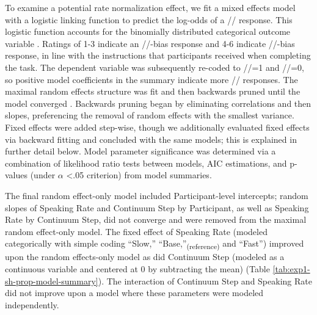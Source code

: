 \documentclass[preprint]{JASA}
\begin{document}

To examine a potential rate normalization effect, we fit a mixed effects model with a logistic linking function to predict the log-odds of a /\textesh/ response. This logistic function accounts for the binomially distributed categorical outcome variable \citep{queneExamplesMixedeffectsModeling2008}. Ratings of 1-3 indicate an /\textesh/-bias response and 4-6 indicate /\textteshlig/-bias response, in line with the instructions that participants received when completing the task. The dependent variable was subsequently re-coded to /\textesh/=1 and /\textteshlig/=0, so positive model coefficients in the summary indicate more /\textesh/ responses. The maximal random effects structure was fit and then backwards pruned until the model converged \citep{barrRandomEffectsStructure2013}. Backwards pruning began by eliminating correlations and then slopes, preferencing the removal of random effects with the smallest variance. Fixed effects were added step-wise, though we additionally evaluated fixed effects via backward fitting and concluded with the same models; this is explained in further detail below. Model parameter significance was determined via a combination of likelihood ratio tests between models, AIC estimations, and p-values (under $\alpha$ <.05 criterion) from model summaries.

The final random effect-only model included Participant-level intercepts; random slopes of Speaking Rate and Continuum Step by Participant, as well as Speaking Rate by Continuum Step, did not converge and were removed from the maximal random effect-only model. The fixed effect of Speaking Rate (modeled categorically with simple coding ``Slow,'' ``Base,''\textsubscript{(reference)} and ``Fast'') improved upon the random effects-only model as did Continuum Step (modeled as a continuous variable and centered at 0 by subtracting the mean) (Table \ref{tab:exp1-sh-prop-model-summary}). The interaction of Continuum Step and Speaking Rate did not improve upon a model where these parameters were modeled independently.
\end{document}
